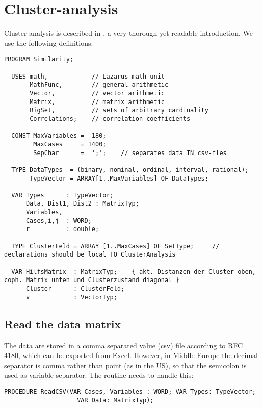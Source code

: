 \chapter{Cluster-analysis}
\begin{refsection}


Cluster analysis is described in \parencite{Sne-73}, a very thorough yet readable introduction. We use the following definitions:
\begin{lstlisting}[caption=Program head]
  PROGRAM Similarity;

  USES math,            // Lazarus math unit
       MathFunc,        // general arithmetic
       Vector,          // vector arithmetic
       Matrix,          // matrix arithmetic
       BigSet,          // sets of arbitrary cardinality
       Correlations;    // correlation coefficients

  CONST MaxVariables =  180;
        MaxCases     = 1400;
        SepChar      =  ';';    // separates data IN csv-fles

  TYPE DataTypes  = (binary, nominal, ordinal, interval, rational);
       TypeVector = ARRAY[1..MaxVariables] OF DataTypes;

  VAR Types      : TypeVector;
      Data, Dist1, Dist2 : MatrixTyp;
      Variables,
      Cases,i,j  : WORD;
      r          : double;

  TYPE ClusterFeld = ARRAY [1..MaxCases] OF SetType;     // declarations should be local TO ClusterAnalysis

  VAR HilfsMatrix  : MatrixTyp;    { akt. Distanzen der Cluster oben, coph. Matrix unten und Clusterzustand diagonal }
      Cluster      : ClusterFeld;
      v            : VectorTyp;
\end{lstlisting}

\section{Read the data matrix}

The data are stored in a comma separated value (csv) file according to  \href{https://tools.ietf.org/html/rfc4180}{RFC 4180}, which can be exported from Excel. However, in Middle Europe the decimal separator is comma rather than point (as in the US), so that the semicolon is used as variable separator. The routine needs to handle this:
\begin{lstlisting}[caption=Read data from comma-separated file]
  PROCEDURE ReadCSV(VAR Cases, Variables : WORD; VAR Types: TypeVector;
                    VAR Data: MatrixTyp);


\end{lstlisting}
\end{refsection}
